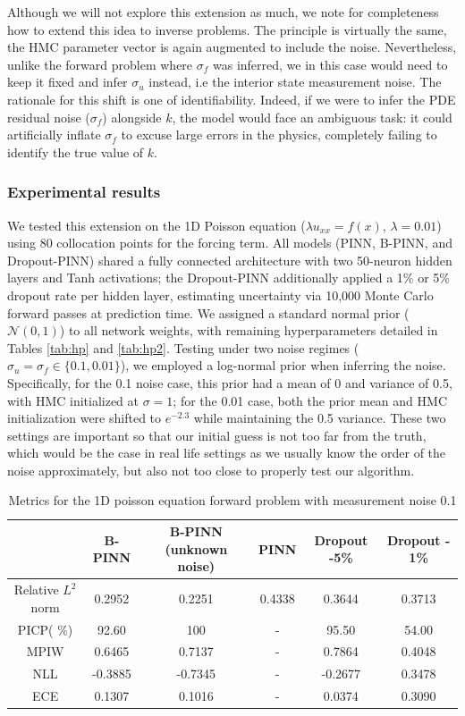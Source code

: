 \documentclass{article}
\begin{document}
 Although we will not explore this extension as much, we note for completeness how to extend this idea to inverse problems. The principle is virtually the same,  the HMC parameter vector is again augmented to include the noise. Nevertheless, unlike the forward problem where $\sigma_f$ was inferred, we in this case would need to keep it fixed and infer $\sigma_u$ instead, i.e the interior state measurement noise. The rationale for this shift is one of identifiability. Indeed, if we were to infer the PDE residual noise ($\sigma_f$) alongside $k$, the model would face an ambiguous task: it could artificially inflate $\sigma_f$ to excuse large errors in the physics, completely failing to identify the true value of $k$. 
\subsubsection{Experimental results}
 We tested this extension on the 1D Poisson equation ($\lambda u_{xx} = f(x)$, $\lambda=0.01$) using 80 collocation points for the forcing term. All models (PINN, B-PINN, and Dropout-PINN) shared a fully connected architecture with two 50-neuron hidden layers and Tanh activations; the Dropout-PINN additionally applied a 1\% or 5\% dropout rate per hidden layer, estimating uncertainty via 10,000 Monte Carlo forward passes at prediction time. We assigned a standard normal prior ($\mathcal{N}(0,1)$) to all network weights, with remaining hyperparameters detailed in Tables \ref{tab:hp} and \ref{tab:hp2}. Testing under two noise regimes ($\sigma_u = \sigma_f \in \{0.1, 0.01\}$), we employed a log-normal prior when inferring the noise. Specifically, for the 0.1 noise case, this prior had a mean of 0 and variance of 0.5, with HMC initialized at $\sigma=1$; for the 0.01 case, both the prior mean and HMC initialization were shifted to $e^{-2.3}$ while maintaining the 0.5 variance. These two settings are important so that our initial guess is not too far from the truth, which would be the case in real life settings as we usually know the order of the noise approximately, but also not too close to properly test our algorithm. 

\begin{table}[h]
\centering
\footnotesize
\begin{tabular}{|c|c|c|c|c|c|}
\hline
 & B-PINN & B-PINN (unknown noise)  & PINN & Dropout -5\% & Dropout - 1\%  \\
\hline
Relative $L^2$ norm & 0.2952  & 0.2251  &   0.4338 & 0.3644 &0.3713 \\
\hline
PICP( \%) & 92.60 & 100 & - & 95.50 & 54.00 \\
\hline
MPIW & 0.6465 & 0.7137 & - & 0.7864 & 0.4048 \\
\hline
NLL & -0.3885 & -0.7345 & - & -0.2677 & 0.3478 \\
\hline
ECE &  0.1307 & 0.1016 & -  & 0.0374 & 0.3090 \\
\hline
\end{tabular}
\caption{\footnotesize Metrics for the 1D poisson equation forward problem with measurement noise 0.1}
\label{tab:5x5}
\end{table}
\end{document}
